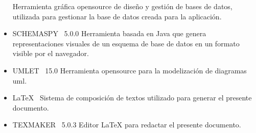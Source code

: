 \begin{itemize}
 Herramienta gráfica \gls{opensource} de diseño y gestión de bases de datos, utilizada para gestionar la base de datos creada para la aplicación.
 \item SCHEMASPY~\cite{SchemaSpy} 5.0.0\newline
 Herramienta basada en Java que genera representaciones visuales de un esquema de base de datos en un formato visible por el navegador. 
 \item UMLET~\cite{Umlet} 15.0\newline
 Herramienta \gls{opensource} para la modelización de diagramas \acrshort{uml}.
 \item  \LaTeX{}~\cite{Latex}\newline
 Sistema de composición de textos utilizado para generar el presente documento. 
 \item TEXMAKER~\citep{TexMaker} 5.0.3\newline
 Editor \LaTeX{} para redactar el presente documento.
\end{itemize} 

	
